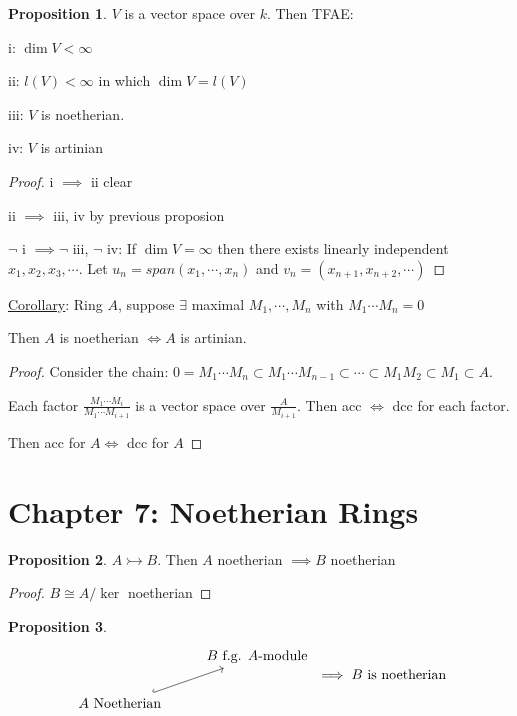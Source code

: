 \documentclass{article}
\theoremstyle{definition}
\newtheorem{proposition}{Proposition}
\begin{document}
\begin{proposition}
    \(V\) is a vector space over \(k\). Then TFAE:

    i: \(\dim V < \infty\)
    
    ii: \(l(V) < \infty\) in which \(\dim V = l(V)\) 
    
    iii: \(V\) is noetherian.

    iv: \(V\) is artinian
\end{proposition}

\begin{proof}
    i \(\implies\) ii clear
    
    ii \(\implies\) iii, iv by previous proposion
    
    \(\lnot\) i \(\implies \lnot\) iii, \(\lnot\) iv: If \(\dim V = \infty\) then there exists linearly independent \(x_1,x_2, x_3,\cdots\). Let \(u_n = span(x_1,\cdots,x_n)\) and \(v_n=(x_{n+1},x_{n+2},\cdots)\)     
\end{proof}

\underline{Corollary}: Ring \(A\), suppose \(\exists\) maximal \(M_1,\cdots,M_n\) with \(M_1\cdots M_n = 0\) 

Then \(A\) is noetherian \(\iff A\) is artinian.

\begin{proof}
    Consider the chain: \(0 = M_1\cdots M_n \subset M_1 \cdots M_{n-1} \subset \cdots \subset M_1 M_2 \subset M_1 \subset A\).
    
    Each factor \(\frac{M_1\cdots M_i}{M_1\cdots M_{i+1}}\) is a vector space over \(\frac{A}{M_{i+1}}\). Then acc \(\iff\) dcc for each factor. 
    
    Then acc for \(A \iff\) dcc for \(A\) 
\end{proof}

\section*{Chapter 7: Noetherian Rings}

\begin{proposition}
    \(A \rightarrowtail B\). Then \(A\) noetherian \(\implies B\) noetherian   
\end{proposition}

\begin{proof}
    \(B \cong A / \ker\) noetherian
\end{proof}

\begin{proposition}
    \[
        \begin{tikzcd}
            & B \text{ f.g. \(A\)-module}\\
            A \text{ Noetherian}  \ar[ur, hook] 
        \end{tikzcd} 
        \implies B \text{ is noetherian}
    \] 
\end{proposition}
\end{document}
